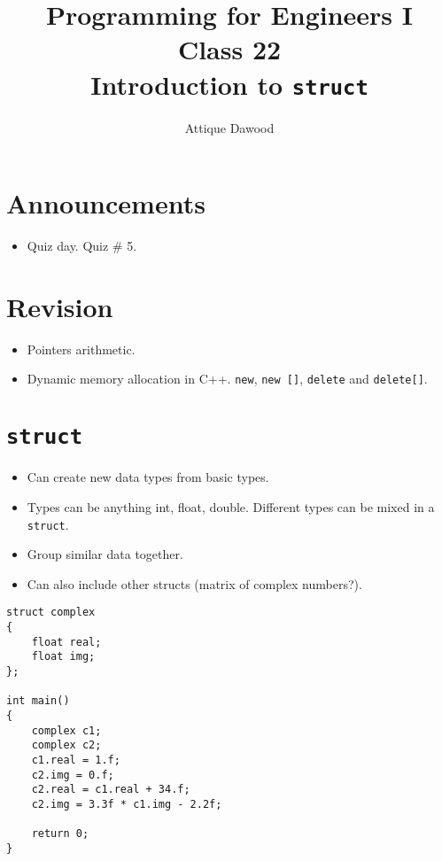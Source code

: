\documentclass[12pt,a4paper]{article}
\title{\vspace{-2cm}Programming for Engineers I\\Class 22\\Introduction to \texttt{struct}}
\author{Attique Dawood}
\begin{document}
\maketitle
\section{Announcements}
\begin{itemize}
\item Quiz day. Quiz \# 5.
\end{itemize}
\section{Revision}
\begin{itemize}
\item Pointers arithmetic.
\item Dynamic memory allocation in C++. \verb|new|, \verb|new []|, \verb|delete| and \verb|delete[]|.
\end{itemize}
\section{\texttt{struct}}
\begin{itemize}
\item Can create new data types from basic types.
\item Types can be anything int, float, double. Different types can be mixed in a \texttt{struct}.
\item Group similar data together.
\item Can also include other structs (matrix of complex numbers?).
\end{itemize}
\begin{lstlisting}[caption={\texttt{struct}}]
struct complex
{
	float real;
	float img;
};

int main()
{
	complex c1;
	complex c2;
	c1.real = 1.f;
	c2.img = 0.f;
	c2.real = c1.real + 34.f;
	c2.img = 3.3f * c1.img - 2.2f;
	
	return 0;
}
\end{lstlisting}
\end{document}
